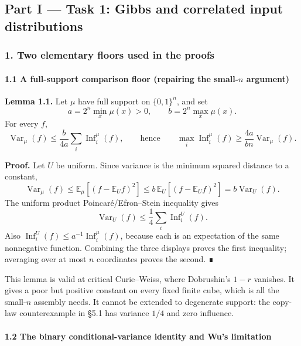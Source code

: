 \subsection{Part I --- Task 1: Gibbs and correlated input distributions}\label{part-i-task-1-gibbs-and-correlated-input-distributions}

\subsubsection{1. Two elementary floors used in the proofs}\label{two-elementary-floors-used-in-the-proofs}

\paragraph{\texorpdfstring{1.1 A full-support comparison floor (repairing the small-\(n\) argument)}{1.1 A full-support comparison floor (repairing the small-n argument)}}\label{a-full-support-comparison-floor-repairing-the-small-n-argument}

\textbf{Lemma 1.1.} Let \(\mu\) have full support on \(\{0,1\}^n\), and set
\[a=2^n\min_x\mu(x)>0,\qquad b=2^n\max_x\mu(x).\]
For every \(f\),
\[\operatorname{Var}_\mu(f)\le\frac{b}{4a}\sum_i\operatorname{Inf}_i^\mu(f),
\qquad\text{hence}\qquad
\max_i\operatorname{Inf}_i^\mu(f)\ge\frac{4a}{bn}\operatorname{Var}_\mu(f).\]

\textbf{Proof.} Let \(U\) be uniform. Since variance is the minimum squared distance to a constant,
\[
\operatorname{Var}_\mu(f)
\le \mathbb E_\mu[(f-\mathbb E_Uf)^2]
\le b\,\mathbb E_U[(f-\mathbb E_Uf)^2]
=b\operatorname{Var}_U(f).
\]
The uniform product Poincaré/Efron--Stein inequality gives
\[\operatorname{Var}_U(f)\le\frac14\sum_i\operatorname{Inf}_i^U(f).\]
Also \(\operatorname{Inf}_i^U(f)\le a^{-1}\operatorname{Inf}_i^\mu(f)\), because each is an expectation of the same nonnegative function. Combining the three displays proves the first inequality; averaging over at most \(n\) coordinates proves the second. ∎

This lemma is valid at critical Curie--Weiss, where Dobrushin's \(1-r\) vanishes. It gives a poor but positive constant on every fixed finite cube, which is all the small-\(n\) assembly needs. It cannot be extended to degenerate support: the copy-law counterexample in §5.1 has variance \(1/4\) and zero influence.

\paragraph{1.2 The binary conditional-variance identity and Wu's limitation}\label{the-binary-conditional-variance-identity-and-wus-limitation}

